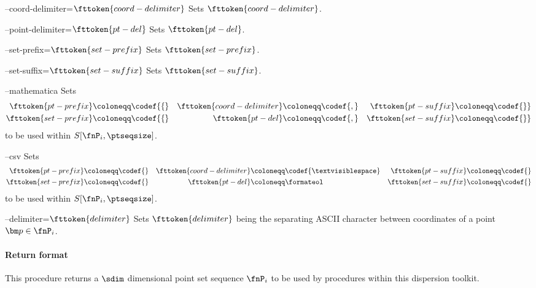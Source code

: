 \begin{procarg}{--coord-delimiter=$\fttoken{coord-delimiter}$}
  Sets $\fttoken{coord-delimiter}$.
\end{procarg}

\begin{procarg}{--point-delimiter=$\fttoken{pt-del}$}
  Sets $\fttoken{pt-del}$.
\end{procarg}

\begin{procarg}{--set-prefix=$\fttoken{set-prefix}$}
  Sets $\fttoken{set-prefix}$.
\end{procarg}

\begin{procarg}{--set-suffix=$\fttoken{set-suffix}$}
  Sets $\fttoken{set-suffix}$.
\end{procarg}

\begin{procarg}{--mathematica}
  Sets 
  \begin{align*}
    \fttoken{pt-prefix} &\coloneqq \codef{\{} &
    \fttoken{coord-delimiter} &\coloneqq \codef{,} &
    \fttoken{pt-suffix} &\coloneqq \codef{\}} \\
    \fttoken{set-prefix} &\coloneqq \codef{\{} &
    \fttoken{pt-del} &\coloneqq \codef{,} &
    \fttoken{set-suffix} &\coloneqq \codef{\}}
  \end{align*}
  to be used within $S[\fnP_i, \ptseqsize]$.
\end{procarg}

\begin{procarg}{--csv}
  Sets 
  \begin{align*}
    \fttoken{pt-prefix} &\coloneqq \codef{} &
    \fttoken{coord-delimiter} &\coloneqq \codef{\textvisiblespace } &
    \fttoken{pt-suffix} &\coloneqq \codef{} \\
    \fttoken{set-prefix} &\coloneqq \codef{} &
    \fttoken{pt-del} &\coloneqq \formateol &
    \fttoken{set-suffix} &\coloneqq \codef{}
  \end{align*}
  to be used within $S[\fnP_i, \ptseqsize]$.
\end{procarg}

\begin{procarg}{--delimiter=$\fttoken{delimiter}$}
  Sets $\fttoken{delimiter}$ being the separating ASCII character between coordinates of a point $\bm p \in \fnP_i$.
\end{procarg}


\procargsilent

\paragraph{Return format}

This procedure returns a $\sdim$ dimensional point set sequence $\fnP_i$ to be used by procedures within this dispersion toolkit.
